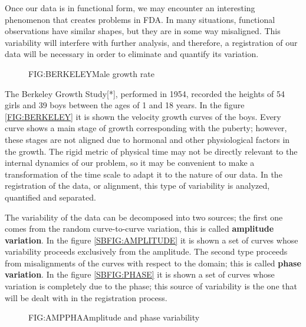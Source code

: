 Once our data is in functional form, we may encounter an interesting phenomenon
that creates problems in FDA. In many situations, functional observations have
similar shapes, but they are in some way misaligned. This variability will
interfere with further analysis, and therefore, a registration of our data will
be necessary in order to eliminate and quantify its variation.

\begin{figure}[Male growth rate]{FIG:BERKELEY}{Male growth rate}
\end{figure}

The Berkeley Growth Study[*], performed in 1954, recorded the heights of 54
girls and 39 boys between the ages of 1 and 18 years. In the figure
\ref{FIG:BERKELEY} it is shown the velocity growth curves of the boys. Every curve shows a main stage of growth corresponding with the puberty;
however, these stages are not aligned due to hormonal and other
physiological factors in the growth. The rigid metric of physical time may not
be directly relevant to the internal dynamics of our problem, so it may be
convenient to make a transformation of the time scale to adapt it to the nature
of our data. In the registration of the data, or alignment, this type of
variability is analyzed, quantified and separated.



The variability of the data can be decomposed into two sources; the first one
comes from the random curve-to-curve variation\cite{Kokoszka2017}, this is called
\textbf{amplitude variation}. In the figure \ref{SBFIG:AMPLITUDE} it is shown a
set of curves whose variability proceeds exclusively from the amplitude. The
second type proceeds from misalignments of the curves with respect to the
domain; this is called \textbf{phase variation}. In the figure
\ref{SBFIG:PHASE} it is shown a set of curves whose variation is completely due
to the phase; this source of variability is the one that will be dealt with in
the registration process.

\begin{figure}[Amplitude and phase variability]{FIG:AMPPHA}{Amplitude and phase variability}
   \quad
\end{figure}
